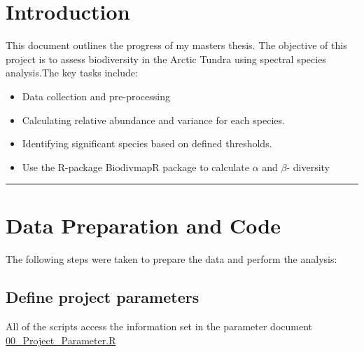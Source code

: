 \documentclass[
]{article}
\author{}
\date{\vspace{-2.5em}}
\providecommand{\tightlist}{%
  \setlength{\itemsep}{0pt}\setlength{\parskip}{0pt}}
\begin{document}
\section{Introduction}\label{introduction}

This document outlines the progress of my masters thesis. The objective
of this project is to assess biodiversity in the Arctic Tundra using
spectral species analysis.The key tasks include:

\begin{itemize}
\tightlist
\item
  Data collection and pre-processing
\item
  Calculating relative abundance and variance for each species.
\item
  Identifying significant species based on defined thresholds.
\item
  Use the R-package BiodivmapR package to calculate \(\alpha\) and
  \(\beta\)- diversity
\end{itemize}

\begin{center}\rule{0.5\linewidth}{0.5pt}\end{center}

\section{Data Preparation and Code}\label{data-preparation-and-code}

The following steps were taken to prepare the data and perform the
analysis:

\subsection{Define project parameters}\label{define-project-parameters}

All of the scripts access the information set in the parameter document
\href{https://github.com/patrickangst/UWW200_Master_Thesis_public/blob/main/MasterThesisRCode/00_Project_Parameter.R}{00\_Project\_Parameter.R}
\end{document}
